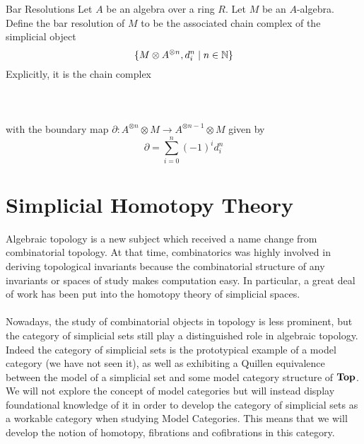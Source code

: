 \documentclass[a4paper]{article}
\begin{document}
\begin{defn}{Bar Resolutions}{} Let $A$ be an algebra over a ring $R$. Let $M$ be an $A$-algebra. Define the bar resolution of $M$ to be the associated chain complex of the simplicial object $$\{M\otimes A^{\otimes n},d_i^n\;|\;n\in\mathbb{N}\}$$ Explicitly, it is the chain complex \\~\\
\\~\\
with the boundary map $\partial:A^{\otimes n}\otimes M\to A^{\otimes n-1}\otimes M$ given by $$\partial=\sum_{i=0}^n(-1)^id_i^n$$
\end{defn}

\pagebreak
\section{Simplicial Homotopy Theory}
Algebraic topology is a new subject which received a name change from combinatorial topology. At that time, combinatorics was highly involved in deriving topological invariants because the combinatorial structure of any invariants or spaces of study makes computation easy. In particular, a great deal of work has been put into the homotopy theory of simplicial spaces. \\~\\

Nowadays, the study of combinatorial objects in topology is less prominent, but the category of simplicial sets still play a distinguished role in algebraic topology. Indeed the category of simplicial sets is the prototypical example of a model category (we have not seen it), as well as exhibiting a Quillen equivalence between the model of a simplicial set and some model category structure of $\bold{Top}$. We will not explore the concept of model categories but will instead display foundational knowledge of it in order to develop the category of simplicial sets as a workable category when studying Model Categories. This means that we will develop the notion of homotopy, fibrations and cofibrations in this category. 
\end{document}
